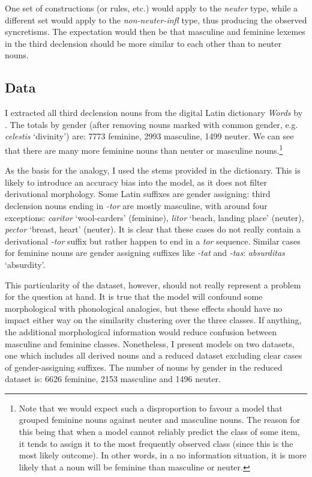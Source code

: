 One set of constructions (or rules, etc.) would apply to the \textit{neuter} type, while a different set would apply to the \textit{non-neuter-infl} type, thus producing the observed syncretisms. The expectation would then be that masculine and feminine lexemes in the third declension should be more similar to each other than to neuter nouns.

\subsection{Data}

I extracted all third declension nouns from the digital Latin dictionary \textit{Words} by \textcite{Whitaker.}. The totals by gender (after removing nouns marked with common gender, e.g. \textit{celestis} `divinity') are: 7773 feminine, 2993 masculine, 1499 neuter. We can see that there are many more feminine nouns than neuter or masculine nouns.\footnote{Note that we would expect such a disproportion to favour a model that grouped feminine nouns against neuter and masculine nouns. The reason for this being that when a model cannot reliably predict the class of some item, it tends to assign it to the most frequently observed class (since this is the most likely outcome). In other words, in a no information situation, it is more likely that a noun will be feminine than masculine or neuter.}

As the basis for the analogy, I used the stems provided in the dictionary. This is likely to introduce an accuracy bias into the model, as it does not filter derivational morphology. Some Latin suffixes are gender assigning: third declension nouns ending in \textit{-tor} are mostly masculine, with around four exceptions: \textit{caritor} `wool-carders' (feminine), \textit{litor} `beach, landing place' (neuter),  \textit{pector} `breast, heart' (neuter). It is clear that these cases do not really contain a derivational \textit{-tor} suffix but rather happen to end in a \textit{tor} sequence. Similar cases for feminine nouns are gender assigning suffixes like \textit{-tat} and \textit{-tas}: \textit{absurditas} `absurdity'.

This particularity of the dataset, however, should not really represent a problem for the question at hand. It is true that the model will confound some morphological with phonological analogies, but these effects should have no impact either way on the similarity clustering over the three classes. If anything, the additional morphological information would reduce confusion between masculine and feminine classes. Nonetheless, I present models on two datasets, one which includes all derived nouns and a reduced dataset excluding clear cases of gender-assigning suffixes. The number of nouns by gender in the reduced dataset is: 6626 feminine, 2153 masculine and 1496 neuter.

